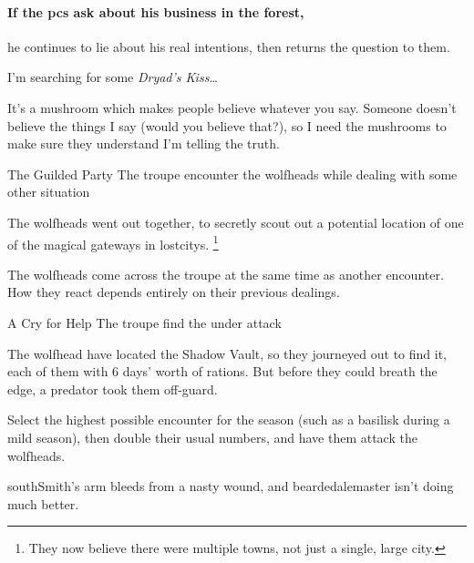 \southSmith
\label{southSmith}

\paragraph{If the \glspl{pc} ask  about his business in the forest,}
he continues to lie about his real intentions, then returns the question to them.

\begin{speechtext}
  I'm searching for some \textit{Dryad's Kiss}\ldots

  It's a mushroom which makes people believe whatever you say.
  Someone doesn't believe the things I say (would you believe that?), so I need the mushrooms to make sure they understand I'm telling the truth.
\end{speechtext}

{\squash The Guilded Party}%
{The troupe encounter the \glspl{wolfhead} while dealing with some other situation}%

\begin{exampletext}
  The \glspl{wolfhead} went out together, to secretly scout out a potential location of one of the magical gateways in \glspl{lostcity}.%
  \footnote{They now believe there were multiple towns, not just a single, large city.}
\end{exampletext}

The \glspl{wolfhead} come across the troupe at the same time as another encounter.
How they react depends entirely on their previous dealings.

{A Cry for Help}%
{The troupe find the  under attack}%

The \gls{wolfhead} have located the Shadow Vault, so they journeyed out to find it, each of them with 6 days' worth of rations.
But before they could breath the \gls{edge}, a predator took them off-guard.

Select the highest possible encounter for the season (such as a basilisk during a mild season), then double their usual numbers, and have them attack the \glspl{wolfhead}.


\Gls{southSmith}'s arm bleeds from a nasty wound, and \gls{beardedalemaster} isn't doing much better.

\setcounter{wounds}{3}
\beardedalemaster

